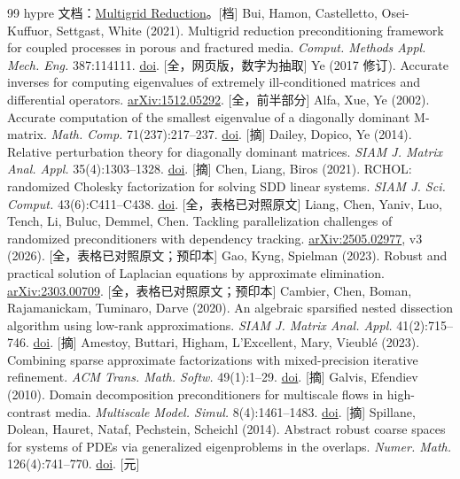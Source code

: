 \documentclass[11pt,a4paper]{ctexart}
\begin{document}
\begin{thebibliography}{99}
 hypre 文档：\href{https://hypre.readthedocs.io/en/latest/solvers-mgr.html}{Multigrid Reduction}。[档]
 Bui, Hamon, Castelletto, Osei-Kuffuor, Settgast, White (2021). Multigrid reduction preconditioning framework for coupled processes in porous and fractured media. \emph{Comput. Methods Appl. Mech. Eng.} 387:114111. \href{https://doi.org/10.1016/j.cma.2021.114111}{doi}. [全，网页版，数字为抽取]
 Ye (2017 修订). Accurate inverses for computing eigenvalues of extremely ill-conditioned matrices and differential operators. \href{https://arxiv.org/abs/1512.05292}{arXiv:1512.05292}. [全，前半部分]
 Alfa, Xue, Ye (2002). Accurate computation of the smallest eigenvalue of a diagonally dominant M-matrix. \emph{Math. Comp.} 71(237):217--237. \href{https://doi.org/10.1090/S0025-5718-01-01325-4}{doi}. [摘]
 Dailey, Dopico, Ye (2014). Relative perturbation theory for diagonally dominant matrices. \emph{SIAM J. Matrix Anal. Appl.} 35(4):1303--1328. \href{https://doi.org/10.1137/130943613}{doi}. [摘]
 Chen, Liang, Biros (2021). RCHOL: randomized Cholesky factorization for solving SDD linear systems. \emph{SIAM J. Sci. Comput.} 43(6):C411--C438. \href{https://doi.org/10.1137/20M1380624}{doi}. [全，表格已对照原文]
 Liang, Chen, Yaniv, Luo, Tench, Li, Buluc, Demmel, Chen. Tackling parallelization challenges of randomized preconditioners with dependency tracking. \href{https://arxiv.org/abs/2505.02977}{arXiv:2505.02977}, v3 (2026). [全，表格已对照原文；预印本]
 Gao, Kyng, Spielman (2023). Robust and practical solution of Laplacian equations by approximate elimination. \href{https://arxiv.org/abs/2303.00709}{arXiv:2303.00709}. [全，表格已对照原文；预印本]
 Cambier, Chen, Boman, Rajamanickam, Tuminaro, Darve (2020). An algebraic sparsified nested dissection algorithm using low-rank approximations. \emph{SIAM J. Matrix Anal. Appl.} 41(2):715--746. \href{https://doi.org/10.1137/19M123806X}{doi}. [摘]
 Amestoy, Buttari, Higham, L'Excellent, Mary, Vieubl\'e (2023). Combining sparse approximate factorizations with mixed-precision iterative refinement. \emph{ACM Trans. Math. Softw.} 49(1):1--29. \href{https://doi.org/10.1145/3582493}{doi}. [摘]
 Galvis, Efendiev (2010). Domain decomposition preconditioners for multiscale flows in high-contrast media. \emph{Multiscale Model. Simul.} 8(4):1461--1483. \href{https://doi.org/10.1137/090751190}{doi}. [摘]
 Spillane, Dolean, Hauret, Nataf, Pechstein, Scheichl (2014). Abstract robust coarse spaces for systems of PDEs via generalized eigenproblems in the overlaps. \emph{Numer. Math.} 126(4):741--770. \href{https://doi.org/10.1007/s00211-013-0576-y}{doi}. [元]

\end{thebibliography}
\end{document}
